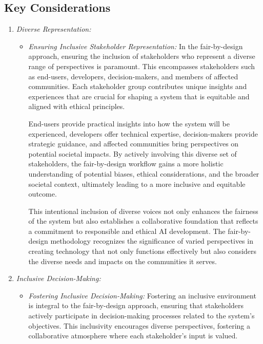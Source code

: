 \subsection{Key Considerations}

\begin{enumerate}

    \item \emph{Diverse Representation:}

        \begin{itemize}

            \item \emph{Ensuring Inclusive Stakeholder Representation:} In the fair-by-design approach, ensuring the inclusion of stakeholders who represent a diverse range of perspectives is paramount. This encompasses stakeholders such as end-users, developers, decision-makers, and members of affected communities. Each stakeholder group contributes unique insights and experiences that are crucial for shaping a system that is equitable and aligned with ethical principles.

            End-users provide practical insights into how the system will be experienced, developers offer technical expertise, decision-makers provide strategic guidance, and affected communities bring perspectives on potential societal impacts. By actively involving this diverse set of stakeholders, the fair-by-design workflow gains a more holistic understanding of potential biases, ethical considerations, and the broader societal context, ultimately leading to a more inclusive and equitable outcome.
            
            This intentional inclusion of diverse voices not only enhances the fairness of the system but also establishes a collaborative foundation that reflects a commitment to responsible and ethical AI development. The fair-by-design methodology recognizes the significance of varied perspectives in creating technology that not only functions effectively but also considers the diverse needs and impacts on the communities it serves.

        \end{itemize}
    
    \item \emph{Inclusive Decision-Making:}
        
    \begin{itemize}
    
        \item \emph{Fostering Inclusive Decision-Making:} Fostering an inclusive environment is integral to the fair-by-design approach, ensuring that stakeholders actively participate in decision-making processes related to the system's objectives. This inclusivity encourages diverse perspectives, fostering a collaborative atmosphere where each stakeholder's input is valued.


\end{itemize}
\end{enumerate}
